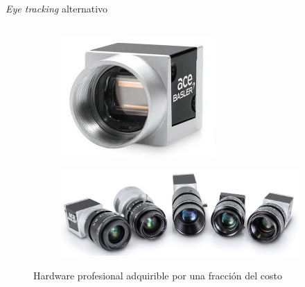 \documentclass[aspectratio=169]{beamer}
\begin{document}
\begin{frame}{\textit{Eye tracking} alternativo}
\begin{columns}
\begin{column}{0.6\textwidth}
      \begin{figure}
        \begin{subfigure}{0.49\textwidth}
          \centering
          \includegraphics[width=0.6\linewidth]{img/basler-camera.jpg}
        \end{subfigure}
        \begin{subfigure}{0.49\textwidth}
          \centering
          \includegraphics[width=0.8\linewidth]{img/basler-cameras-with-lens.png}
        \end{subfigure}
        \caption{Hardware profesional adquirible por una fracción del costo}
      \end{figure}

    \end{column}
  \end{columns}
\end{frame}
\end{document}
